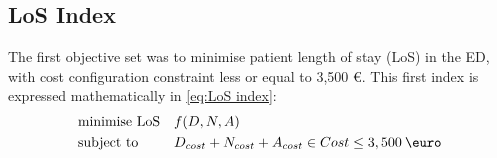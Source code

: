 \documentclass[11pt]{article} %
\begin{document}

\subsection{LoS Index}

The first objective set was to minimise patient length of stay (LoS)
in the ED, with cost configuration constraint less or equal to 3,500
\euro. This first index is expressed mathematically in \ref{eq:LoS index}:
\begin{equation}
\begin{aligned} & {\text{minimise LoS}} &  & f(D,N,A)\\
 & \text{subject to} &  & D_{cost}+N_{cost}+A_{cost}\in Cost\leq3,500\:\text{\euro}
\end{aligned}
\label{eq:LoS index}
\end{equation}
\end{document}
